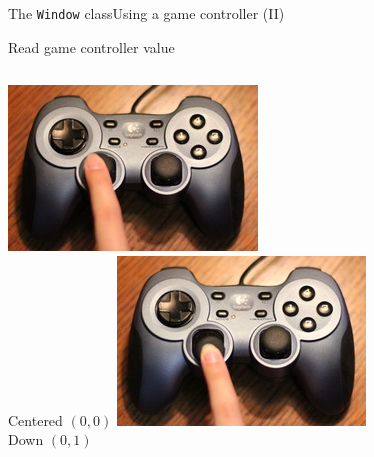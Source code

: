 \documentclass[10pt,compress]{beamer} %
\begin{document}
\begin{frame}{The \texttt{Window} class}{Using a game controller (II)}
	\begin{exampleblock}{Read game controller value}
	\vspace{-0.2cm}
	
	\vspace{-0.2cm}
	\end{exampleblock}	

	\bigskip

    \begin{columns}
		\includegraphics[width=\linewidth]{figs/controller-centered.jpg}\\
		\centering Centered $(0,0)$
		\includegraphics[width=\linewidth]{figs/controller-down.jpg}\\
		\centering Down $(0,1)$

\end{columns}
\end{frame}
\end{document}
